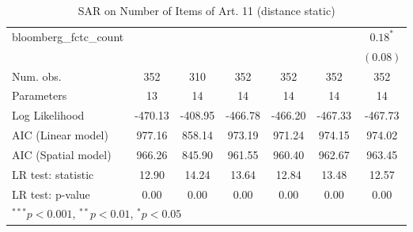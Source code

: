\begin{table}[!h]
\begin{center}
\begin{tabular}{l c c c c c c }
bloomberg\_fctc\_count  &               &              &              &              &               & $0.18^{*}$    \\
                        &               &              &              &              &               & $(0.08)$      \\
\midrule
Num. obs.               & 352           & 310          & 352          & 352          & 352           & 352           \\
Parameters              & 13            & 14           & 14           & 14           & 14            & 14            \\
Log Likelihood          & -470.13       & -408.95      & -466.78      & -466.20      & -467.33       & -467.73       \\
AIC (Linear model)      & 977.16        & 858.14       & 973.19       & 971.24       & 974.15        & 974.02        \\
AIC (Spatial model)     & 966.26        & 845.90       & 961.55       & 960.40       & 962.67        & 963.45        \\
LR test: statistic      & 12.90         & 14.24        & 13.64        & 12.84        & 13.48         & 12.57         \\
LR test: p-value        & 0.00          & 0.00         & 0.00         & 0.00         & 0.00          & 0.00          \\
\bottomrule
\multicolumn{7}{l}{\scriptsize{$^{***}p<0.001$, $^{**}p<0.01$, $^*p<0.05$}}
\end{tabular}
\caption{SAR on Number of Items of Art. 11 (distance static)}
\label{table:coefficients}
\end{center}
\end{table}
